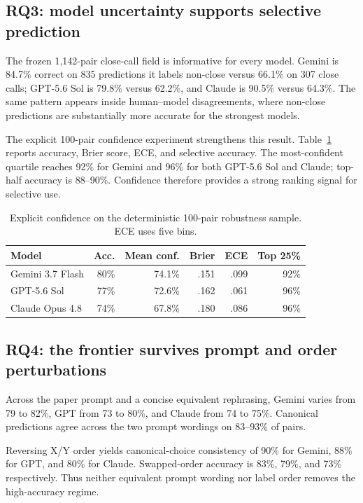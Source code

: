 \documentclass[10pt,twocolumn]{article}
\begin{document}
\subsection{RQ3: model uncertainty supports selective prediction}
The frozen 1,142-pair close-call field is informative for every model. Gemini is 84.7\% correct on 835 predictions it labels non-close versus 66.1\% on 307 close calls; GPT-5.6 Sol is 79.8\% versus 62.2\%, and Claude is 90.5\% versus 64.3\%. The same pattern appears inside human--model disagreements, where non-close predictions are substantially more accurate for the strongest models.

The explicit 100-pair confidence experiment strengthens this result. Table~\ref{tab:confidence} reports accuracy, Brier score, ECE, and selective accuracy. The most-confident quartile reaches 92\% for Gemini and 96\% for both GPT-5.6 Sol and Claude; top-half accuracy is 88--90\%. Confidence therefore provides a strong ranking signal for selective use.

\begin{table}[t]
\caption{Explicit confidence on the deterministic 100-pair robustness sample. ECE uses five bins.}
\label{tab:confidence}
\centering\small
\setlength{\tabcolsep}{2.1pt}
\begin{tabular}{@{}lrrrrr@{}}
\toprule
Model & Acc. & Mean conf. & Brier & ECE & Top 25\% \\
\midrule
Gemini 3.7 Flash & 80\% & 74.1\% & .151 & .099 & 92\% \\
GPT-5.6 Sol & 77\% & 72.6\% & .162 & .061 & 96\% \\
Claude Opus 4.8 & 74\% & 67.8\% & .180 & .086 & 96\% \\
\bottomrule
\end{tabular}
\end{table}

\subsection{RQ4: the frontier survives prompt and order perturbations}
Across the paper prompt and a concise equivalent rephrasing, Gemini varies from 79 to 82\%, GPT from 73 to 80\%, and Claude from 74 to 75\%. Canonical predictions agree across the two prompt wordings on 83--93\% of pairs.

Reversing X/Y order yields canonical-choice consistency of 90\% for Gemini, 88\% for GPT, and 80\% for Claude. Swapped-order accuracy is 83\%, 79\%, and 73\% respectively. Thus neither equivalent prompt wording nor label order removes the high-accuracy regime.
\end{document}

